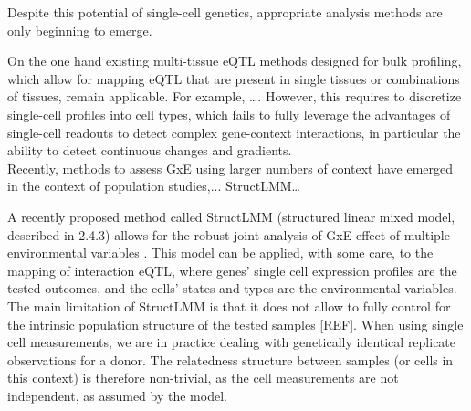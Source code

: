 Despite this potential of single-cell genetics, appropriate analysis methods are only beginning to emerge. 

On the one hand existing multi-tissue eQTL methods designed for bulk profiling, which allow for mapping eQTL that are present in single tissues or combinations of tissues, remain applicable. 
For example, …\cite{flutre2013statistical, urbut2019flexible}.
However, this requires to discretize single-cell profiles into cell types, which fails to fully leverage the advantages of single-cell readouts to detect complex gene-context interactions, in particular the ability to detect continuous changes and gradients. \\

Recently, methods to assess GxE using larger numbers of context have emerged in the context of population studies,... StructLMM…




A recently proposed method called StructLMM (structured linear mixed model, described in 2.4.3) allows for the robust joint analysis of GxE effect of multiple environmental variables \cite{moore2019linear}.
This model can be applied, with some care, to the mapping of interaction eQTL, where genes’ single cell expression profiles are the tested outcomes, and the cells’ states and types are the environmental variables. 
The main limitation of StructLMM is that it does not allow to fully control for the intrinsic population structure of the tested samples [REF]. 
When using single cell measurements, we are in practice dealing with genetically identical replicate observations for a donor. 
The relatedness structure between samples (or cells in this context) is therefore non-trivial, as the cell measurements are not independent, as assumed by the model.\\

